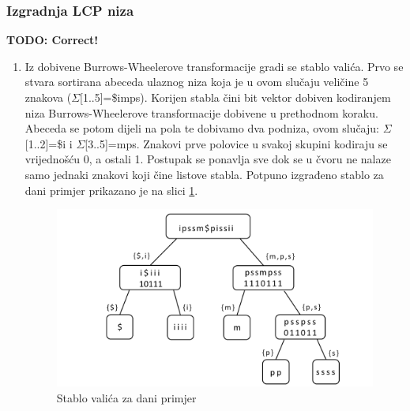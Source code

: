 \documentclass[a4paper,12pt]{article}
\begin{document}
\subsubsection{Izgradnja LCP niza}
\textbf{TODO: Correct!}
\begin{enumerate}
	\item Iz dobivene Burrows-Wheelerove transformacije gradi se stablo valića. Prvo se stvara sortirana abeceda ulaznog niza koja je u ovom slučaju veličine 5 znakova ($\Sigma$[1..5]=\$imps). Korijen stabla čini bit vektor dobiven kodiranjem niza Burrows-Wheelerove transformacije dobivene u prethodnom koraku. Abeceda se potom dijeli na pola te dobivamo dva podniza, ovom slučaju: $\Sigma$[1..2]=\$i i $\Sigma$[3..5]=mps. Znakovi prve polovice u svakoj skupini kodiraju se vrijednošću 0, a ostali 1. Postupak se ponavlja sve dok se u čvoru ne nalaze samo jednaki znakovi koji čine listove stabla. Potpuno izgrađeno stablo za dani primjer prikazano je na slici \ref{fig:waveletTree}.

	\begin{figure}
		\begin{center}
			\includegraphics[width=\columnwidth]{waveletTree.png}
			\caption{Stablo valića za dani primjer}
			\label{fig:waveletTree}
		\end{center}
	\end{figure}



\end{enumerate}
\end{document}
